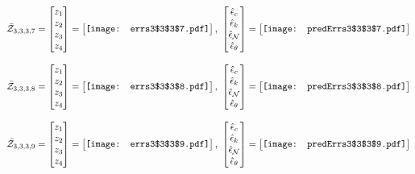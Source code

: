 \documentclass[12pt]{article}
\begin{document}
\begin{gather*}
\bar{\mathcal{Z}}_{3,3,3,7}=\begin{bmatrix}
z_1\\
z_2\\
z_3\\
z_4
 \end{bmatrix}= \begin{bmatrix}
\vcenter{\hbox{\texttt{[image: errs3\$3\$3\$7.pdf]}}}
 \end{bmatrix},\,\, \begin{bmatrix}
\hat{\epsilon}_c\\\hat{\epsilon}_k\\\hat{\epsilon}_\mathcal{N}\\\hat{\epsilon}_\theta
 \end{bmatrix}=\begin{bmatrix}
\vcenter{\hbox{\texttt{[image: predErrs3\$3\$3\$7.pdf]}}}
 \end{bmatrix}
\end{gather*}


\begin{gather*}
\bar{\mathcal{Z}}_{3,3,3,8}=\begin{bmatrix}
z_1\\
z_2\\
z_3\\
z_4
 \end{bmatrix}= \begin{bmatrix}
\vcenter{\hbox{\texttt{[image: errs3\$3\$3\$8.pdf]}}}
 \end{bmatrix},\,\, \begin{bmatrix}
\hat{\epsilon}_c\\\hat{\epsilon}_k\\\hat{\epsilon}_\mathcal{N}\\\hat{\epsilon}_\theta
 \end{bmatrix}=\begin{bmatrix}
\vcenter{\hbox{\texttt{[image: predErrs3\$3\$3\$8.pdf]}}}
 \end{bmatrix}
\end{gather*}



\begin{gather*}
\bar{\mathcal{Z}}_{3,3,3,9}=\begin{bmatrix}
z_1\\
z_2\\
z_3\\
z_4
 \end{bmatrix}= \begin{bmatrix}
\vcenter{\hbox{\texttt{[image: errs3\$3\$3\$9.pdf]}}}
 \end{bmatrix},\,\, \begin{bmatrix}
\hat{\epsilon}_c\\\hat{\epsilon}_k\\\hat{\epsilon}_\mathcal{N}\\\hat{\epsilon}_\theta
 \end{bmatrix}=\begin{bmatrix}
\vcenter{\hbox{\texttt{[image: predErrs3\$3\$3\$9.pdf]}}}
 \end{bmatrix}
\end{gather*}
\end{document}
